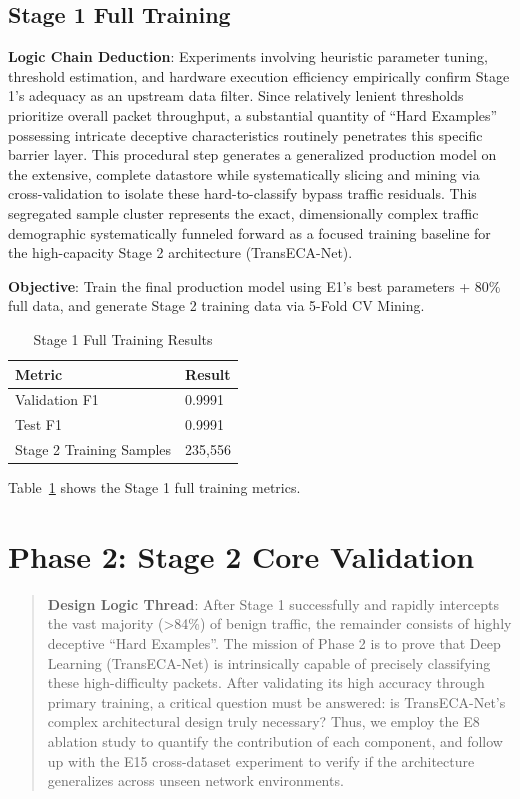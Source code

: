 \documentclass[sigconf]{acmart}
\begin{document}
\subsection{Stage 1 Full Training}
\textbf{Logic Chain Deduction}: Experiments involving heuristic parameter tuning, threshold estimation, and hardware execution efficiency empirically confirm Stage 1's adequacy as an upstream data filter. Since relatively lenient thresholds prioritize overall packet throughput, a substantial quantity of ``Hard Examples'' possessing intricate deceptive characteristics routinely penetrates this specific barrier layer. This procedural step generates a generalized production model on the extensive, complete datastore while systematically slicing and mining via cross-validation to isolate these hard-to-classify bypass traffic residuals. This segregated sample cluster represents the exact, dimensionally complex traffic demographic systematically funneled forward as a focused training baseline for the high-capacity Stage 2 architecture (TransECA-Net).

\textbf{Objective}: Train the final production model using E1's best parameters + 80\% full data, and generate Stage 2 training data via 5-Fold CV Mining.

\begin{table}[!h]
\caption{Stage 1 Full Training Results}
\label{tab:s1_full}
\begin{tabular}{ll}
\toprule
\textbf{Metric} & \textbf{Result} \\
\midrule
Validation F1 & 0.9991 \\
Test F1 & 0.9991 \\
Stage 2 Training Samples & 235,556 \\
\bottomrule
\end{tabular}
\end{table}

\noindent Table~\ref{tab:s1_full} shows the Stage 1 full training metrics.

\section{Phase 2: Stage 2 Core Validation}
\begin{quote}
\textbf{Design Logic Thread}: After Stage 1 successfully and rapidly intercepts the vast majority (>84\%) of benign traffic, the remainder consists of highly deceptive ``Hard Examples''. The mission of Phase 2 is to prove that Deep Learning (TransECA-Net) is intrinsically capable of precisely classifying these high-difficulty packets. After validating its high accuracy through primary training, a critical question must be answered: is TransECA-Net's complex architectural design truly necessary? Thus, we employ the E8 ablation study to quantify the contribution of each component, and follow up with the E15 cross-dataset experiment to verify if the architecture generalizes across unseen network environments.
\end{quote}
\end{document}
